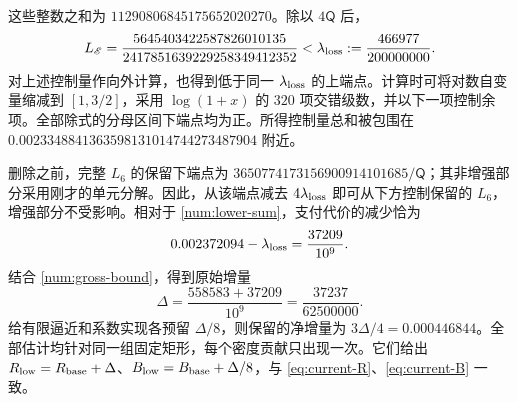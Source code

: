 这些整数之和为 $11290806845175652020270$。除以 $4\mathsf Q$ 后，
\begin{equation}
 L_{\mathscr E}
 =\frac{5645403422587826010135}
 {2417851639229258349412352}
 <\lambda_{\rm loss}:=\frac{466977}{200000000}.
 \label{num:saved-loss}
\end{equation}
对上述控制量作向外计算，也得到低于同一 $\lambda_{\rm loss}$ 的上端点。计算时可将对数自变量缩减到 $[1,3/2]$，采用 $\log(1+x)$ 的 $320$ 项交错级数，并以下一项控制余项。全部除式的分母区间下端点均为正。所得控制量总和被包围在 $0.0023348841363598131014744273487904$ 附近。

删除之前，完整 $L_6$ 的保留下端点为 $3650774173156900914101685/\mathsf Q$；其非增强部分采用刚才的单元分解。因此，从该端点减去 $4\lambda_{\rm loss}$ 即可从下方控制保留的 $L_6$，增强部分不受影响。相对于 \eqref{num:lower-sum}，支付代价的减少恰为
\[
 0.002372094-\lambda_{\rm loss}=\frac{37209}{10^9}.
\]
结合 \eqref{num:gross-bound}，得到原始增量
\[
 \Delta=\frac{558583+37209}{10^9}
       =\frac{37237}{62500000}.
\]
给有限逼近和系数实现各预留 $\Delta/8$，则保留的净增量为 $3\Delta/4=0.000446844$。全部估计均针对同一组固定矩形，每个密度贡献只出现一次。它们给出 $R_{\rm low}=R_{\rm base}+\Delta$、$B_{\rm low}=B_{\rm base}+\Delta/8$，与 \eqref{eq:current-R}、\eqref{eq:current-B} 一致。
